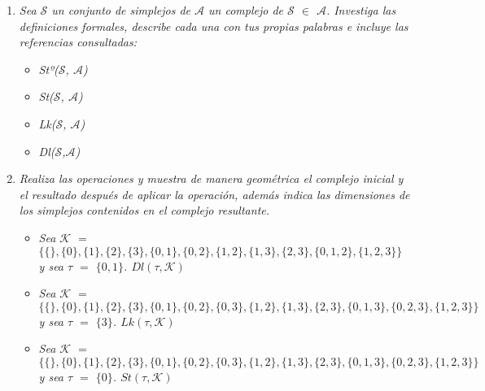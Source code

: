 \documentclass{article}
\begin{document}
\begin{enumerate}
  \item{
      \textsl{
    Sea $\mathcal{S}$ un conjunto de simplejos de $\mathcal{A}$ un
    complejo de $\mathcal{S}$ $\in$ $\mathcal{A}$. Investiga las
    definiciones formales, describe cada una con tus propias palabras
    e incluye las referencias consultadas:
    }
    \begin{itemize}
      
    \item{
        \textsl{
          Stº($\mathcal{S}$, $\mathcal{A}$)}
      }
      
    \item{
        \textsl{
          St($\mathcal{S}$, $\mathcal{A}$)}
      }

    \item
      \textsl{
        {Lk($\mathcal{S}$, $\mathcal{A}$)}
      }

    \item{
        \textsl{
          Dl($\mathcal{S}$,$\mathcal{A}$)}
        }
    \end{itemize}

  
  }

\item{
    \textsl{
      Realiza las operaciones y muestra de manera geométrica el
      complejo inicial y el resultado después de aplicar la operación,
      además indica las dimensiones de los simplejos contenidos en el
      complejo resultante.
    }

    \begin{itemize}
    \item{
        \textsl{
        Sea $\mathcal{K}$ $=$ $\{\{\}, \{0\}, \{1\}, \{2\}, \{3\},
        \{0,1\}, \{0,2\}, \{1,2\}, \{1,3\}, \{2,3\}, \{0,1,2\},
        \{1,2,3\} \}$ y sea $\tau$ $=$ $\{0,1\}$. $Dl(\tau,\mathcal{K})$
      }
      }
      
    \item{
        \textsl{
        Sea $\mathcal{K}$ $=$ $\{\{\}, \{0\}, \{1\}, \{2\}, \{3\},
        \{0,1\}, \{0,2\}, \{0,3\}, \{1,2\}, \{1,3\}, \{2,3\}, \{0,1,3\},
        \{0,2,3\}, \{1,2,3\}\}$ y sea $\tau$ $=$ $\{3\}$. $Lk(\tau,\mathcal{K})$
      }
    }

    \item{
        \textsl{
          Sea $\mathcal{K}$ $=$ $\{ \{ \}, \{0\} , \{1\}, \{2\}, \{3\}, \{0, 1\},\{0,
              2\}, \{0, 3\},\{1, 2\}, \{1, 3\}, \{2, 3\},
              \{0,1,3\},\{0,2,3\},\{1,2,3\}\}$ y sea $\tau$ $=$ $\{0\}$. $St(\tau,\mathcal{K})$
        }
      }


\end{itemize}}
\end{enumerate}
\end{document}
